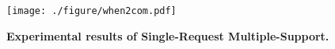 \begin{figure}[t]
    \vspace{1mm}
    \begin{center}
    \centerline{\texttt{[image: ./figure/when2com.pdf]}}
    \caption{
        \textbf{Experimental results of Single-Request Multiple-Support.}} 
        \label{fig:when2com_exp}
    \end{center}
    \vspace{-8mm}
\end{figure}
